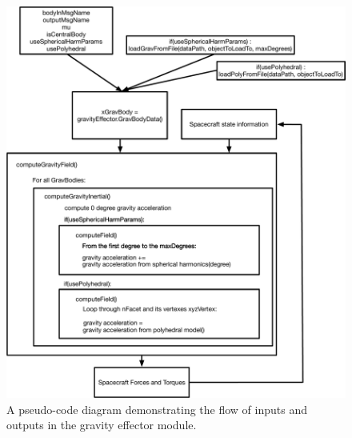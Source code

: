 \begin{figure}[H]
	\centering \includegraphics[height=1.0\textwidth, keepaspectratio]{Figures/codeFlow.pdf}
	\caption{A pseudo-code diagram demonstrating the flow of inputs and outputs in the gravity effector module.}
	\label{img:codeFlow}
\end{figure}

